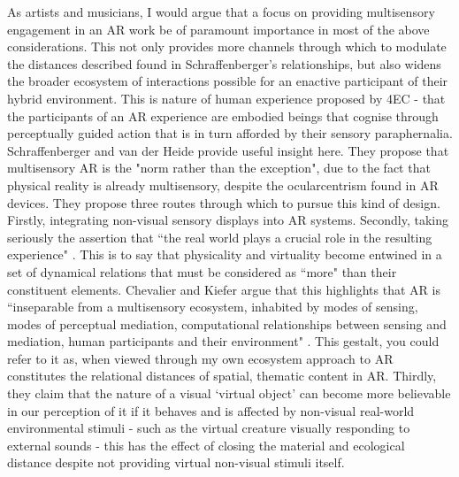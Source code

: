 As artists and musicians, I would argue that a focus on providing multisensory engagement in an AR work be of paramount importance in most of the above considerations. This not only provides more channels through which to modulate the distances described found in Schraffenberger's relationships, but also widens the broader ecosystem of interactions possible for an enactive participant of their hybrid environment. This is nature of human experience proposed by 4EC - that the participants of an AR experience are embodied beings that cognise through perceptually guided action that is in turn afforded by their sensory paraphernalia. Schraffenberger and van der Heide provide useful insight here. They propose that multisensory AR is the "norm rather than the exception", due to the fact that physical reality is already multisensory, despite the ocularcentrism found in AR devices. They propose three routes through which to pursue this kind of design. Firstly, integrating non-visual sensory displays into  AR systems. Secondly, taking seriously the assertion that ``the real world plays a crucial role in the resulting experience" \citeyearpar[p. 5]{schraffenberger2016}. This is to say that physicality and virtuality become entwined in a set of dynamical relations that must be considered as ``more" than their constituent elements. Chevalier and Kiefer argue that this highlights that AR is ``inseparable from a multisensory ecosystem, inhabited by modes of sensing, modes of perceptual mediation, computational relationships between sensing and mediation, human participants and their environment" \citeyearpar[p. 4]{chevalier2020}. This gestalt, you could refer to it as, when viewed through my own ecosystem approach to AR constitutes the relational distances of spatial, thematic content in AR. Thirdly, they claim that the nature of a visual `virtual object' can become more believable in our perception of it if it behaves and is affected by non-visual real-world environmental stimuli - such as the virtual creature visually responding to external sounds - this has the effect of closing the material and ecological distance despite not providing virtual non-visual stimuli itself. 

